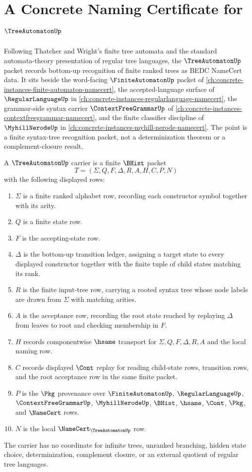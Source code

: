 \chapter{A Concrete Naming Certificate for $\TreeAutomatonUp$}
\label{ch:concrete-instances-tree-automaton-namecert}

Following Thatcher and Wright's finite tree automata and the standard automata-theory presentation of regular tree languages, the $\TreeAutomatonUp$ packet records bottom-up recognition of finite ranked trees as BEDC NameCert data. It sits beside the word-facing $\FiniteAutomatonUp$ packet of \autoref{ch:concrete-instances-finite-automaton-namecert}, the accepted-language surface of $\RegularLanguageUp$ in \autoref{ch:concrete-instances-regularlanguage-namecert}, the grammar-side syntax carrier $\ContextFreeGrammarUp$ of \autoref{ch:concrete-instances-contextfreegrammar-namecert}, and the finite classifier discipline of $\MyhillNerodeUp$ in \autoref{ch:concrete-instances-myhill-nerode-namecert}. The point is a finite syntax-tree recognition packet, not a determinization theorem or a complement-closure result.

\begin{definition}
\label{def:tree-automaton-carrier}
A $\TreeAutomatonUp$ carrier is a finite $\BHist$ packet
$$
T=(\Sigma,Q,F,\Delta,R,A,H,C,P,N)
$$
with the following displayed rows:
\begin{enumerate}
\item $\Sigma$ is a finite ranked alphabet row, recording each constructor symbol together with its arity.
\item $Q$ is a finite state row.
\item $F$ is the accepting-state row.
\item $\Delta$ is the bottom-up transition ledger, assigning a target state to every displayed constructor together with the finite tuple of child states matching its rank.
\item $R$ is the finite input-tree row, carrying a rooted syntax tree whose node labels are drawn from $\Sigma$ with matching arities.
\item $A$ is the acceptance row, recording the root state reached by replaying $\Delta$ from leaves to root and checking membership in $F$.
\item $H$ records componentwise $\hsame$ transport for $\Sigma,Q,F,\Delta,R,A$ and the local naming row.
\item $C$ records displayed $\Cont$ replay for reading child-state rows, transition rows, and the root acceptance row in the same finite packet.
\item $P$ is the $\Pkg$ provenance over $\FiniteAutomatonUp$, $\RegularLanguageUp$, $\ContextFreeGrammarUp$, $\MyhillNerodeUp$, $\BHist$, $\hsame$, $\Cont$, $\Pkg$, and $\NameCert$ rows.
\item $N$ is the local $\NameCert_{\TreeAutomatonUp}$ row.
\end{enumerate}
The carrier has no coordinate for infinite trees, unranked branching, hidden state choice, determinization, complement closure, or an external quotient of regular tree languages.
\end{definition}

